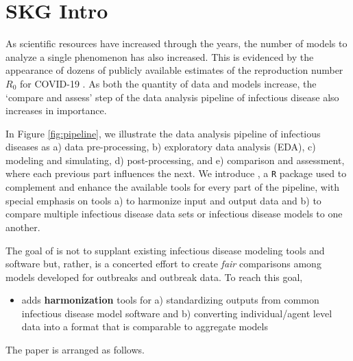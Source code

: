 
\section[SKG tries an Intro]{SKG Intro} \label{sec:skg_intro}

As scientific resources have increased through the years, the number of models to analyze a single phenomenon has also increased.  This is evidenced by the appearance of dozens of publicly available estimates of the reproduction number $R_0$ for COVID-19 \citep{}.  As both the quantity of data and models increase, the `compare and assess' step of the data analysis pipeline of infectious disease also increases in importance.

In Figure \ref{fig:pipeline}, we illustrate the data analysis pipeline of infectious diseases as a) data pre-processing, b) exploratory data analysis (EDA), c) modeling and simulating, d) post-processing, and e) comparison and assessment, where each previous part influences the next.  We introduce , a \texttt{R} package used to complement and enhance the available tools for every part of the pipeline, with special emphasis on tools a) to harmonize input and output data and b) to compare multiple infectious disease data sets or infectious disease models to one another.

The goal of  is not to supplant existing infectious disease modeling tools and software but, rather, is a concerted effort to create \textit{fair} comparisons among models developed for outbreaks and outbreak data.  To reach this goal,  

\begin{itemize}
  \item adds \textbf{harmonization} tools for a) standardizing outputs from common infectious disease model software  and b) converting individual/agent level data into a format that is comparable to aggregate models
\end{itemize}


The paper is arranged as follows.  



